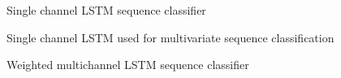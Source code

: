 \documentclass[aspectratio=43, notes]{beamer}
\begin{document}


\begin{frame}
\begin{figure}
	\caption{Single channel LSTM sequence classifier}
	\label{fig:single_channel}
\end{figure}
\end{frame}


\begin{frame}
\begin{figure}
	\caption{Single channel LSTM used for multivariate sequence classification}
	\label{fig:featureFusion}
\end{figure}
\end{frame}


\begin{frame}
\begin{figure}
	\caption{Weighted multichannel LSTM sequence classifier}
	\label{fig:weighted_channel}
\end{figure}
\end{frame}
\end{document}
